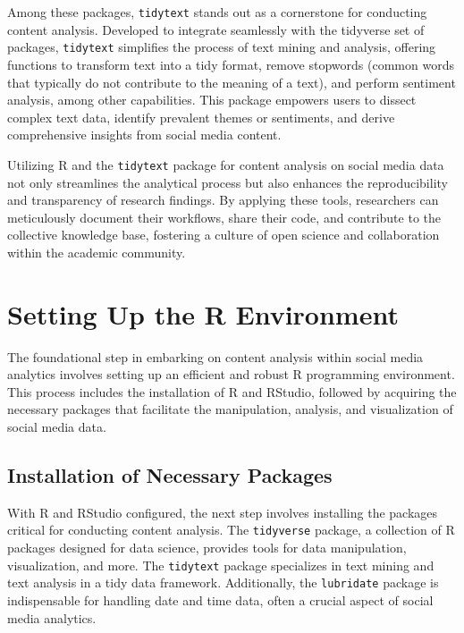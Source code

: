 \documentclass[
]{book}
\begin{document}
Among these packages, \texttt{tidytext} stands out as a cornerstone for conducting content analysis. Developed to integrate seamlessly with the tidyverse set of packages, \texttt{tidytext} simplifies the process of text mining and analysis, offering functions to transform text into a tidy format, remove stopwords (common words that typically do not contribute to the meaning of a text), and perform sentiment analysis, among other capabilities. This package empowers users to dissect complex text data, identify prevalent themes or sentiments, and derive comprehensive insights from social media content.

Utilizing R and the \texttt{tidytext} package for content analysis on social media data not only streamlines the analytical process but also enhances the reproducibility and transparency of research findings. By applying these tools, researchers can meticulously document their workflows, share their code, and contribute to the collective knowledge base, fostering a culture of open science and collaboration within the academic community.

\hypertarget{setting-up-the-r-environment}{%
\section{Setting Up the R Environment}\label{setting-up-the-r-environment}}

The foundational step in embarking on content analysis within social media analytics involves setting up an efficient and robust R programming environment. This process includes the installation of R and RStudio, followed by acquiring the necessary packages that facilitate the manipulation, analysis, and visualization of social media data.

\hypertarget{installation-of-necessary-packages}{%
\subsection{Installation of Necessary Packages}\label{installation-of-necessary-packages}}

With R and RStudio configured, the next step involves installing the packages critical for conducting content analysis. The \texttt{tidyverse} package, a collection of R packages designed for data science, provides tools for data manipulation, visualization, and more. The \texttt{tidytext} package specializes in text mining and text analysis in a tidy data framework. Additionally, the \texttt{lubridate} package is indispensable for handling date and time data, often a crucial aspect of social media analytics.
\end{document}
